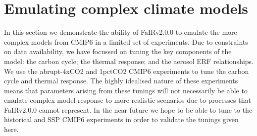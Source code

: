 \documentclass[gmd, manuscript]{copernicus}
\begin{document}
\section{Emulating complex climate models} \label{cmip6_tuning}
In this section we demonstrate the ability of FaIRv2.0.0 to emulate the more complex models from CMIP6 \citep{Eyring2016} in a limited set of experiments. Due to constraints on data availability, we have focussed on tuning the key components of the model: the carbon cycle; the thermal response; and the aerosol ERF relationships. We use the abrupt-4xCO2 and 1pctCO2 CMIP6 experiments to tune the carbon cycle and thermal response. The highly idealised nature of these experiments means that parameters arising from these tunings will not necessarily be able to emulate complex model response to more realistic scenarios due to processes that FaIRv2.0.0 cannot represent. In the near future we hope to be able to tune to the historical and SSP CMIP6 experiments in order to validate the tunings given here. 
\end{document}
